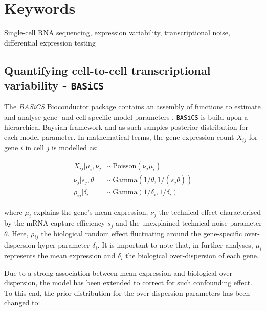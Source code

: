 \documentclass[9pt,a4paper,]{extarticle}
\begin{document}
\section*{Keywords}
Single-cell RNA sequencing, expression variability, transcriptional noise, differential expression testing


\clearpage
\pagestyle{main}

\hypertarget{quantifying-cell-to-cell-transcriptional-variability---basics}{%
\subsection{\texorpdfstring{Quantifying cell-to-cell transcriptional variability - \texttt{BASiCS}}{Quantifying cell-to-cell transcriptional variability - BASiCS}}\label{quantifying-cell-to-cell-transcriptional-variability---basics}}

The \emph{\href{https://bioconductor.org/packages/3.11/BASiCS}{BASiCS}} Bioconductor package contains an assembly of
functions to estimate and analyse gene- and cell-specific model parameters
\citep{Vallejos2015BASiCS, Vallejos2016, Eling2018}.
\texttt{BASiCS} is build upon a hierarchical Baysian framework and as such samples
posterior distribution for each model parameter.
In mathematical terms, the gene expression count \(X_{ij}\) for gene \(i\) in cell
\(j\) is modelled as:

\[
\begin{aligned}
X_{ij}|\mu_i,\nu_j&\sim{}\text{Poisson}(\nu_j\mu_i)\\
\nu_j|s_j,\theta&\sim{}\text{Gamma}(1/\theta,1/(s_j\theta))\\
\rho_{ij}|\delta_i&\sim{}\text{Gamma}(1/\delta_i,1/\delta_i)
\end{aligned}
\]

where \(\mu_i\) explains the gene's mean expression, \(\nu_j\) the technical effect
characterised by the mRNA capture efficiency \(s_j\) and the unexplained technical
noise parameter \(\theta\).
Here, \(\rho_{ij}\) the biological
random effect fluctuating around the gene-specific over-dispersion
hyper-parameter \(\delta_i\).
It is important to note that, in further analyses, \(\mu_i\) represents the
mean expression and \(\delta_i\) the biological over-dispersion of each gene.

Due to a strong association between mean expression and biological
over-dispersion, the model has been extended to correct for such confounding
effect. To this end, the prior distribution for the over-dispersion parameters
has been changed to:
\end{document}
